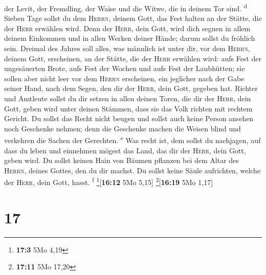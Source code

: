 der Levit, der Fremdling, der Waise und die Witwe, die in deinem Tor
sind. \textsuperscript{d}  Sieben Tage sollst du dem
\textsc{Herrn}, deinem Gott, das Fest halten an der Stätte, die der
\textsc{Herr} erwählen wird. Denn der \textsc{Herr}, dein Gott, wird
dich segnen in allem deinem Einkommen und in allen Werken deiner Hände;
darum sollst du fröhlich sein.  Dreimal des Jahres soll
alles, was männlich ist unter dir, vor dem \textsc{Herrn}, deinem Gott,
erscheinen, an der Stätte, die der \textsc{Herr} erwählen wird: aufs
Fest der ungesäuerten Brote, aufs Fest der Wochen und aufs Fest der
Laubhütten; sie sollen aber nicht leer vor dem \textsc{Herrn}
erscheinen,  ein jeglicher nach der Gabe seiner Hand,
nach dem Segen, den dir der \textsc{Herr}, dein Gott, gegeben hat.
 Richter und Amtleute sollst du dir setzen in allen
deinen Toren, die dir der \textsc{Herr}, dein Gott, geben wird unter
deinen Stämmen, dass sie das Volk richten mit rechtem Gericht.
 Du sollst das Recht nicht beugen und sollst auch keine
Person ansehen noch Geschenke nehmen; denn die Geschenke machen die
Weisen blind und verkehren die Sachen der Gerechten. \textsuperscript{e}
 Was recht ist, dem sollst du nachjagen, auf dass du
leben und einnehmen mögest das Land, das dir der \textsc{Herr}, dein
Gott, geben wird.  Du sollst keinen Hain von Bäumen
pflanzen bei dem Altar des \textsc{Herrn}, deines Gottes, den du dir
machst.  Du sollst keine Säule aufrichten, welche der
\textsc{Herr}, dein Gott, hasst. \textsuperscript{f}
\footnote{\textbf{17:3} 5Mo 4,19}{[}\textbf{16:12} 5Mo 5,15{]}
\footnote{\textbf{17:11} 5Mo 17,20}{[}\textbf{16:19} 5Mo 1,17{]}

\hypertarget{section-16}{%
\section{17}\label{section-16}}


